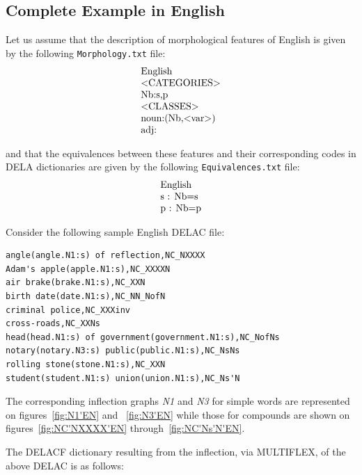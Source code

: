 \subsection{Complete Example in English}
Let us assume that the description of morphological features of English is given
by the following \verb+Morphology.txt+ file:
\[
\begin{array}[l]{l}
$English$ \\
$<CATEGORIES>$ \\
$Nb:s,p$ \\
$<CLASSES>$ \\
$noun:(Nb,<var>)$ \\
$adj:$
\end{array}
\]

\bigskip
\noindent and that the equivalences between these features and their corresponding codes in DELA dictionaries 
are given by the following \verb+Equivalences.txt+ file: 
\[
\begin{array}[l]{l}
$English$ \\
$s : Nb=s$ \\
$p : Nb=p$ \\
\end{array}
\]

\bigskip
\noindent Consider the following sample English DELAC file:

\begin{verbatim}
angle(angle.N1:s) of reflection,NC_NXXXX
Adam's apple(apple.N1:s),NC_XXXXN
air brake(brake.N1:s),NC_XXN
birth date(date.N1:s),NC_NN_NofN
criminal police,NC_XXXinv
cross-roads,NC_XXNs
head(head.N1:s) of government(government.N1:s),NC_NofNs
notary(notary.N3:s) public(public.N1:s),NC_NsNs
rolling stone(stone.N1:s),NC_XXN
student(student.N1:s) union(union.N1:s),NC_Ns'N
\end{verbatim}

\bigskip
\noindent The corresponding inflection graphs \emph{N1} and \emph{N3} for simple words are 
represented on figures~\ref{fig:N1'EN} and ~\ref{fig:N3'EN} while those for compounds are shown 
on figures~\ref{fig:NC'NXXXX'EN} through~\ref{fig:NC'Ns'N'EN}. 

\bigskip
\noindent The DELACF dictionary resulting from the inflection, via MULTIFLEX, of the above DELAC 
is as follows:

